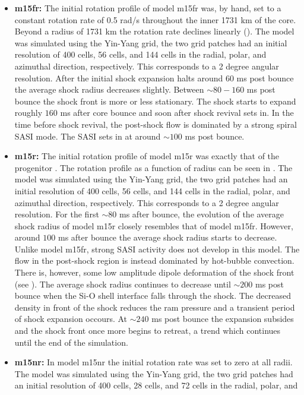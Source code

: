 \begin{itemize}
\item \textbf{m15fr:} The initial rotation profile of model m15fr was, by hand, set to a constant rotation rate of 0.5 rad/s
throughout the inner 1731 km of the core. Beyond a radius of 1731 km the rotation rate declines linearly (). 
The model was simulated using the 
Yin-Yang grid, the two grid patches had an initial resolution of 400 cells, 56 cells, and 144 cells in the radial, polar, and
azimuthal direction, respectively. This corresponds to a 2 degree angular resolution. 
After the initial shock expansion halts around $60$ ms post bounce the average shock radius decreases slightly.
Between $\sim 80 - 160$ ms post bounce the shock front is more or less stationary. 
The shock starts to expand roughly $160$ ms after core bounce and soon after shock revival sets in.
In the time before shock revival, the post-shock flow is dominated by a strong spiral SASI mode. The SASI sets in at around
$\sim 100$ ms post bounce.
\item \textbf{m15r:} The initial rotation profile of model m15r was exactly that of the progenitor \citep{heger_05}.
The rotation profile as a function of radius can be seen in .  
The model was simulated using the Yin-Yang grid, the two grid patches had an initial resolution of 400 cells, 
56 cells, and 144 cells in the radial, polar, and azimuthal direction, respectively. This corresponds to a 2 degree angular resolution.
For the first $\sim 80$ ms after bounce, the evolution of the average shock radius of model m15r closely resembles that
of model m15fr. However, around $100$ ms after bounce the average shock radius starts to decrease. Unlike model m15fr, strong 
SASI activity does not develop in this model. The flow in the post-shock region is instead dominated by hot-bubble convection.
There is, however, some low amplitude dipole deformation of the shock front (see ).
The average shock radius continues to decrease until
$\sim 200$ ms post bounce when the Si-O shell interface falls through the shock. The decreased density in front of the shock reduces the 
ram pressure and a transient period of shock expansion occours. At $\sim 240$ ms post bounce the expansion subsides and
the shock front once more begins to retreat, a trend which continues until the end of the simulation.  
\item \textbf{m15nr:} In model m15nr the initial rotation rate was set to zero at all radii. The model was simulated using the Yin-Yang grid, the
two grid patches had an initial resolution of 400 cells, 28 cells, and 72 cells in the radial, polar, and

\end{itemize}
